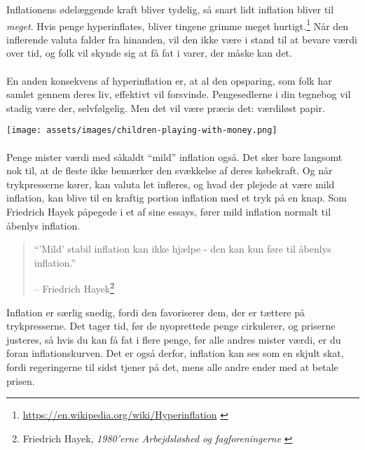 Inflationens ødelæggende kraft bliver tydelig, så snart lidt inflation bliver til \textit{meget}. Hvis penge hyperinflates, bliver tingene grimme meget hurtigt.\footnote{\url{https://en.wikipedia.org/wiki/Hyperinflation}
\cite{wiki:hyperinflation}} Når den inflerende valuta falder fra hinanden, vil den ikke være i stand til at bevare værdi over tid, og folk vil skynde sig at få fat i varer, der måske kan det.

\paragraph{}
En anden konsekvens af hyperinflation er, at al den opsparing, som folk har samlet gennem deres liv, effektivt vil forsvinde. Pengesedlerne i din tegnebog vil stadig være der, selvfølgelig. Men det vil være præcis det: værdiløst papir.

\begin{center}
\texttt{[image: assets/images/children-playing-with-money.png]}
\label{fig:children-playing-with-money}
\end{center}

\paragraph{}
Penge mister værdi med såkaldt \enquote{mild} inflation også. Det sker bare langsomt nok til, at de fleste ikke bemærker den svækkelse af deres købekraft. Og når trykpresserne kører, kan valuta let infleres, og hvad der plejede at være mild inflation, kan blive til en kraftig portion inflation med et tryk på en knap. Som Friedrich Hayek påpegede i et af sine essays, fører mild inflation normalt til åbenlys inflation.

\begin{quotation}\begin{samepage}
\enquote{'Mild' stabil inflation kan ikke hjælpe - den kan kun føre til åbenlys inflation.}
\begin{flushright} -- Friedrich Hayek\footnote{Friedrich Hayek, \textit{1980'erne Arbejdsløshed og fagforeningerne} \cite{hayek-inflation}}
\end{flushright}\end{samepage}\end{quotation}

Inflation er særlig snedig, fordi den favoriserer dem, der er tættere på trykpresserne. Det tager tid, før de nyoprettede penge cirkulerer, og priserne justeres, så hvis du kan få fat i flere penge, før alle andres mister værdi, er du foran inflationskurven. Det er også derfor, inflation kan ses som en skjult skat, fordi regeringerne til sidst tjener på det, mens alle andre ender med at betale prisen.

